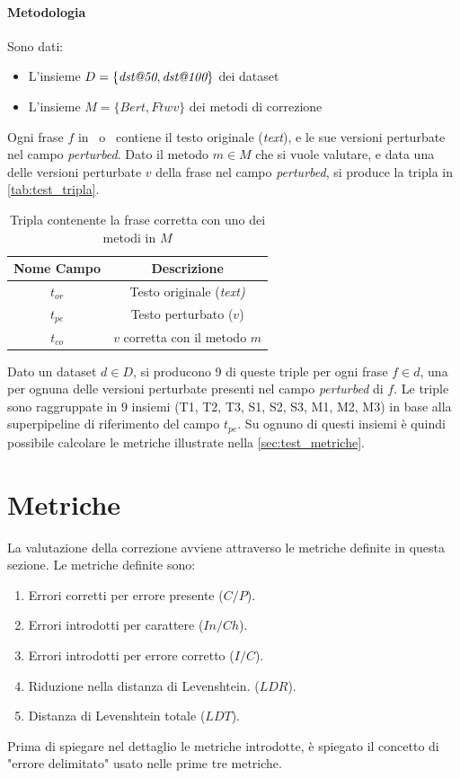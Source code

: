 \paragraph{Metodologia} Sono dati:
\begin{itemize}
\item L'insieme $D = \{\textit{dst@50}, \textit{dst@100} \}$ dei dataset
\item L'insieme $M = \{\textit{Bert}, \textit{Ftwv}\}$ dei metodi di correzione
\end{itemize}
Ogni frase $f$ in \dsta\ o \dstb\ contiene il testo originale (\textit{text}), e le sue versioni perturbate nel campo \textit{perturbed}. Dato il metodo $m \in M$ che si vuole valutare, e data una delle versioni perturbate $v$ della frase nel campo \textit{perturbed}, si produce la tripla in \autoref{tab:test_tripla}.

\begin{table}[H]
\centering
\begin{tabular}{cc}
\textbf{Nome Campo} & \textbf{Descrizione} \\
\hline
$t_{or}$ & Testo originale (\textit{text)}\\
$t_{pe}$ & Testo perturbato ($v$)\\
$t_{co}$ & $v$ corretta con il metodo $m$
\end{tabular}
\caption{Tripla contenente la frase corretta con uno dei metodi in $M$}
\label{tab:test_tripla}
\end{table}
\noindent
Dato un dataset $d \in D$, si producono 9 di queste triple per ogni frase $f \in d$, una per ognuna delle versioni perturbate presenti nel campo \textit{perturbed} di  $f$. Le triple sono raggruppate in 9 insiemi (T1, T2, T3, S1, S2, S3, M1, M2, M3) in base alla superpipeline di riferimento del campo $t_{pe}$. Su ognuno di questi insiemi è quindi possibile calcolare le metriche illustrate nella \autoref{sec:test_metriche}.

\section{Metriche}
\label{sec:test_metriche}
La valutazione della correzione avviene attraverso le metriche definite in questa sezione. Le metriche definite sono:
\begin{enumerate}
\item Errori corretti per errore presente ($C/P$).
\item Errori introdotti per carattere ($In/Ch$).
\item Errori introdotti per errore corretto ($I/C$).
\item Riduzione nella distanza di Levenshtein. ($LDR$).
\item Distanza di Levenshtein totale ($LDT$).
\end{enumerate}
\noindent
Prima di spiegare nel dettaglio le metriche introdotte, è spiegato il concetto di "errore delimitato" usato nelle prime tre metriche.


